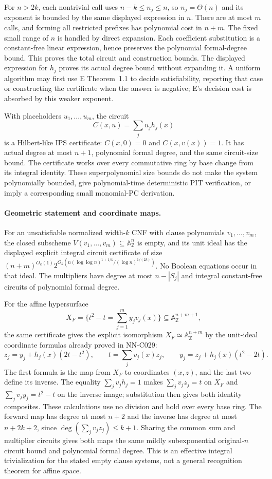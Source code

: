 For $n>2k$, each nontrivial call uses $n-k\le n_j\le n$,
so $n_j=\Theta(n)$ and its exponent is bounded by the same
displayed expression in $n$.  There are at most $m$ calls,
and forming all restricted prefixes has polynomial cost
in $n+m$.  The fixed small range of $n$ is handled by direct
expansion.  Each coefficient substitution is a constant-free
linear expression, hence preserves the polynomial formal-degree
bound.  This proves the total circuit and construction bounds.
The displayed expression for $h_j$ proves its actual degree
bound without expanding it.  A uniform algorithm may first
use E Theorem~1.1 to decide satisfiability, reporting that
case or constructing the certificate when the answer is
negative; E's decision cost is absorbed by this weaker exponent.

With placeholders $u_1,\ldots,u_m$, the circuit
\[
                    C(x,u)=\sum_j u_jh_j(x)
\]
is a Hilbert-like IPS certificate: $C(x,0)=0$ and
$C(x,v(x))=1$.  It has actual degree at most $n+1$,
polynomial formal degree, and the same circuit-size bound.
The certificate works over every commutative ring by base
change from its integral identity.  These superpolynomial
size bounds do not make the system polynomially bounded,
give polynomial-time deterministic PIT verification, or
imply a corresponding small monomial-PC derivation.

\paragraph{Geometric statement and coordinate maps.}
For an unsatisfiable normalized width-$k$ CNF with clause
polynomials $v_1,\ldots,v_m$, the closed subscheme
$V(v_1,\ldots,v_m)\subseteq\mathbb A^n_{\mathbb Z}$ is empty,
and its unit ideal has the displayed explicit integral
circuit certificate of size
$(n+m)^{O_k(1)}2^{O_k(n(\log\log n)^{1+1/k}/(\log n)^{1/(2k)})}$.
No Boolean equations occur in that ideal.  The multipliers
have degree at most $n-|S_j|$ and integral constant-free
circuits of polynomial formal degree.

For the affine hypersurface
\[
 X_F=\{t^2-t=\sum_{j=1}^m y_jv_j(x)\}
                          \subseteq\mathbb A^{n+m+1}_{\mathbb Z},
\]
the same certificate gives the explicit isomorphism
$X_F\simeq\mathbb A^{n+m}_{\mathbb Z}$ by the unit-ideal
coordinate formulas already proved in NN-C029:
\[
 z_j=y_j+h_j(x)(2t-t^2),\qquad
 t=\sum_jv_j(x)z_j,\qquad
 y_j=z_j+h_j(x)(t^2-2t).
\]
The first formula is the map from $X_F$ to coordinates
$(x,z)$, and the last two define its inverse.  The equality
$\sum_jv_jh_j=1$ makes $\sum_jv_jz_j=t$ on $X_F$ and
$\sum_jv_jy_j=t^2-t$ on the inverse image; substitution
then gives both identity composites.  These calculations
use no division and hold over every base ring.  The forward
map has degree at most $n+2$ and the inverse has degree at
most $n+2k+2$, since $\deg(\sum_jv_jz_j)\le k+1$.
Sharing the common sum and multiplier circuits gives both
maps the same mildly subexponential original-$n$ circuit
bound and polynomial formal degree.  This is an effective
integral trivialization for the stated empty clause systems,
not a general recognition theorem for affine space.
